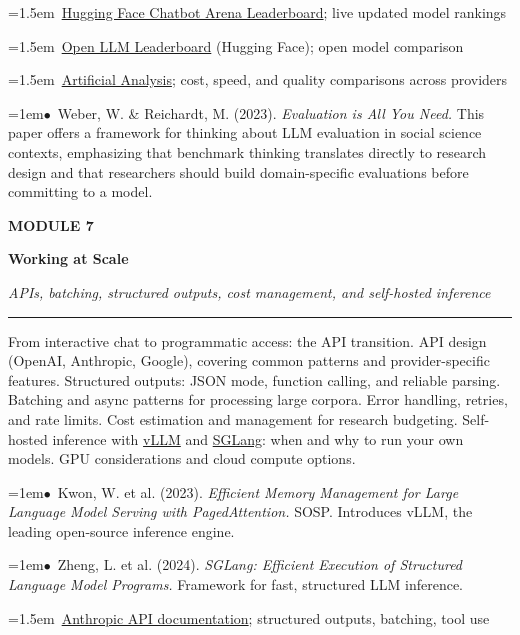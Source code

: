 \documentclass[11pt, a4paper]{article}
\newcommand{\modulehead}[3]{%
  \vspace{0.5em}
  {\small\sffamily\bfseries\textcolor{accent}{MODULE #1}}\par\vspace{-0.3em}
  {\Large\sffamily\bfseries\textcolor{dark}{#2}}\par\vspace{-0.2em}
  {\small\textit{\textcolor{muted}{#3}}}\par
  \vspace{0.2em}\textcolor{bordercol}{\rule{\textwidth}{0.3pt}}\par
}
\newcommand{\seclabel}[1]{%
  \vspace{0.6em}{\normalsize\sffamily\bfseries\textcolor{accent}{#1}}\par\vspace{0.2em}
}
\newcommand{\refpaper}[1]{%
  \par\hangindent=1em\hangafter=1\noindent\textcolor{accent}{\small$\bullet$}~{\small #1}\par
}
\newcommand{\resource}[1]{%
  \par\hangindent=1.5em\hangafter=1\noindent\hspace{0.5em}{\small\textcolor{accent}{\guilsinglright}}~{\small #1}\par
}
\begin{document}
\seclabel{Further Resources}

\resource{\href{https://huggingface.co/spaces/lmarena-ai/chatbot-arena}{Hugging Face Chatbot Arena Leaderboard}; live updated model rankings}

\resource{\href{https://huggingface.co/spaces/open-llm-leaderboard/open_llm_leaderboard}{Open LLM Leaderboard} (Hugging Face); open model comparison}

\resource{\href{https://artificialanalysis.ai}{Artificial Analysis}; cost, speed, and quality comparisons across providers}

\seclabel{Social Science Application}

\refpaper{Weber, W. \& Reichardt, M. (2023). \textit{Evaluation is All You Need.} This paper offers a framework for thinking about LLM evaluation in social science contexts, emphasizing that benchmark thinking translates directly to research design and that researchers should build domain-specific evaluations before committing to a model.}

\vspace{1.5em}
\newpage
\modulehead{7}{Working at Scale}{APIs, batching, structured outputs, cost management, and self-hosted inference}

\seclabel{Core Concepts}

From interactive chat to programmatic access: the API transition. API design (OpenAI, Anthropic, Google), covering common patterns and provider-specific features. Structured outputs: JSON mode, function calling, and reliable parsing. Batching and async patterns for processing large corpora. Error handling, retries, and rate limits. Cost estimation and management for research budgeting. Self-hosted inference with \href{https://github.com/vllm-project/vllm}{vLLM} and \href{https://github.com/sgl-project/sglang}{SGLang}: when and why to run your own models. GPU considerations and cloud compute options.

\seclabel{Core Readings}

\refpaper{Kwon, W. et al. (2023). \textit{Efficient Memory Management for Large Language Model Serving with PagedAttention.} SOSP. Introduces vLLM, the leading open-source inference engine.}

\refpaper{Zheng, L. et al. (2024). \textit{SGLang: Efficient Execution of Structured Language Model Programs.} Framework for fast, structured LLM inference.}

\seclabel{Further Resources}

\resource{\href{https://docs.anthropic.com}{Anthropic API documentation}; structured outputs, batching, tool use}
\end{document}
